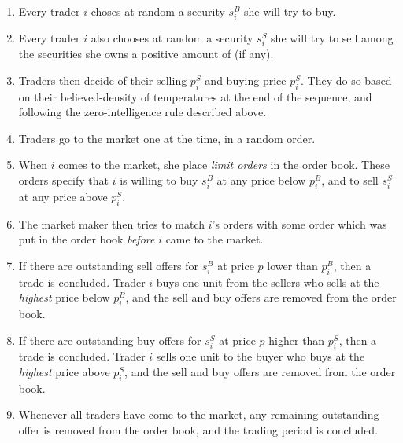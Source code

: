 \documentclass{sig-alternate}
\begin{document}
	\begin{enumerate}
			\setlength\itemsep{0em}
		\item Every trader $i$ choses at random a security $s_i^B$ she will try to buy.
		\item Every trader $i$ also chooses at random a security $s_i^S$ she will try to sell among the securities she owns a positive amount of (if any).
		\item Traders then decide of their selling $p_i^S$ and buying price $p_i^S$. They do so based on their believed-density of temperatures at the end of the sequence, and following the zero-intelligence rule described above.
		\item Traders go to the market one at the time, in a random order.
		\item When $i$ comes to the market, she place \emph{limit orders} in the order book. These orders  specify that $i$ is willing to buy $s_i^B$ at  any price below $p_i^B$, and to sell $s_i^S$ at any price above $p_i^S$.
		\item The market maker then tries to match $i$'s orders with some order which was put in the order book \emph{before} $i$ came to the market.
		\item If there are  outstanding sell offers for $s_i^B$ at price $p$ lower than $p_i^B$, then a trade is concluded. Trader $i$ buys one unit from the sellers who sells at the \emph{highest} price below $p_i^B$, and the sell and buy offers are removed from the order book.
		\item If there are  outstanding buy offers for $s_i^S$ at price $p$ higher than $p_i^S$, then a trade is concluded. Trader $i$ sells one unit to the buyer who buys at the \emph{highest} price above $p_i^S$, and the  sell and buy offers are removed from the order book.
		\item Whenever all traders have come to the market, any remaining outstanding offer is removed from the order book, and the trading period is concluded. 
	\end{enumerate} 
	
\end{document}
